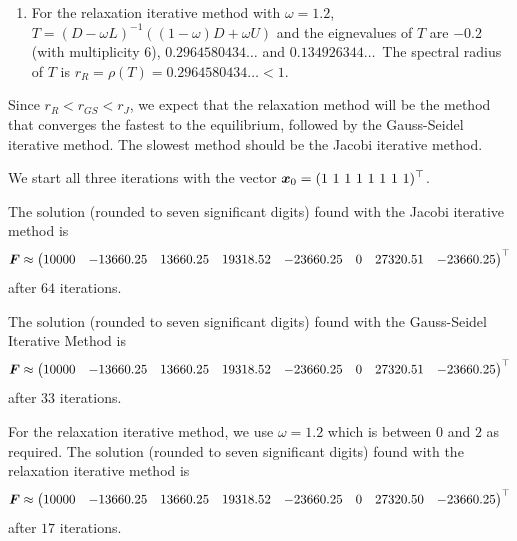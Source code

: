 {\begin{enumerate}
  eigenvalues of $T$ are $0$ (with multiplicity 7) and
  $0.5773502691\ldots$\  Hence, the spectral radius of $T$ is 
  $r_{GS} = \rho(T) = 0.5773502691\ldots < 1$.
\item For the relaxation iterative method with $\omega=1.2$,
  $T = (D-\omega L)^{-1} ((1-\omega)D+\omega U)$ and the eignevalues
  of $T$ are $-0.2$ (with multiplicity 6), $0.2964580434\ldots$ and
  $0.134926344\ldots$\  The spectral radius of $T$ is 
  $r_R = \rho(T) = 0.2964580434\ldots < 1$.
\end{enumerate}
Since $r_R < r_{GS} < r_J$, we expect that the relaxation method will
be the method that converges the fastest to the equilibrium, followed
by the Gauss-Seidel iterative method.  The slowest method should be
the Jacobi iterative method.

We start all three iterations with the vector
$\DS \VEC{x}_0 = (1 \ 1 \ 1 \ 1 \ 1 \ 1 \ 1 \ 1)^\top$.

 The solution (rounded to seven significant digits) found with
the Jacobi iterative method is
\[
\bm{F} \approx \begin{pmatrix}
10000 & -13660.25 & 13660.25 & 19318.52 &  -23660.25 & 0 &
27320.51 & -23660.25 \end{pmatrix}^\top
\]
after $64$ iterations.

 The solution (rounded to seven significant digits) found with
the Gauss-Seidel Iterative Method is
\[
\bm{F} \approx \begin{pmatrix}
10000 & -13660.25 & 13660.25 & 19318.52 & -23660.25 & 0 &
27320.51 & -23660.25
\end{pmatrix}^\top
\]
after $33$ iterations.

 For the relaxation iterative method, we use $\omega = 1.2$
which is between $0$ and $2$ as required.  The solution (rounded to
seven significant digits) found with the relaxation iterative method
is
\[
\bm{F} \approx \begin{pmatrix}
10000 & -13660.25 & 13660.25 & 19318.52 & -23660.25 & 0 &
27320.50 & -23660.25
\end{pmatrix}^\top
\]
after $17$ iterations.
}

